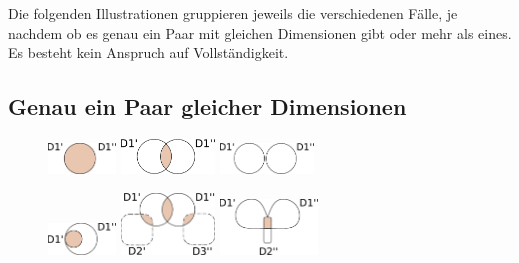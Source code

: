 \documentclass[11pt]{article}
\begin{document}
\noindent
Die folgenden Illustrationen gruppieren jeweils die verschiedenen Fälle, je nachdem ob es genau ein Paar mit gleichen Dimensionen gibt oder mehr als eines. Es besteht kein Anspruch auf Vollständigkeit.

%
% 
\subsection{Genau ein Paar gleicher Dimensionen\\}

\begin{figure}[!htb]
    \centering
    \includegraphics[width=1.8cm]{CaseDifferentiation/CaseDifferentiation_1SameDim_AllDePairPartnered.pdf}
    \label{}
\endminipage\hfill
{}
    \centering
    \includegraphics[width=2.5cm]{CaseDifferentiation/CaseDifferentiation_1SameDim_SomeDePairPartnered.pdf}
    \label{}
\endminipage\hfill
{}%
    \centering
    \includegraphics[width=2.5cm]{CaseDifferentiation/CaseDifferentiation_1SameDim_NoDePairPartnered.pdf}
    \label{}
\endminipage
\end{figure}



\begin{figure}[!htb]
%
    \centering
    \includegraphics[width=1.8cm]{CaseDifferentiation/CaseDifferentiation_1SameDim_OneDimPartOfTheDim.pdf}
    \label{}
\endminipage
{}%
    \centering
    \includegraphics[width=2.5cm]{CaseDifferentiation/CaseDifferentiation_1SameDim_SomeDePairPartnered_ConnEqualUnequalDim.pdf}
    \label{}
\endminipage
{}%
    \centering
    \includegraphics[width=2.6cm]{CaseDifferentiation/CaseDifferentiation_1SameDimAnd1Diff_AllDimSameDE.pdf}
    \label{}
\endminipage
\end{figure}
\end{document}

